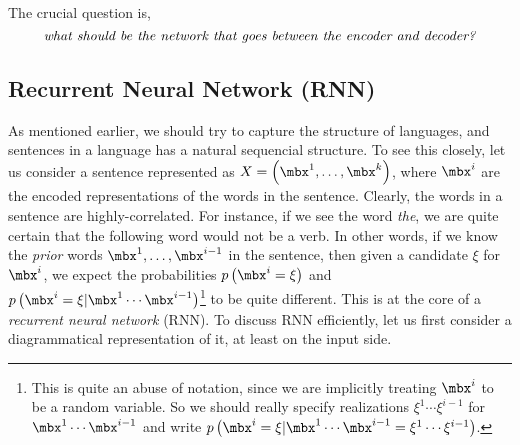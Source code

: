 \documentclass[11pt]{article}
\begin{document}
    \np The crucial question is,
    \begin{equation}
        \text{\textit{what should be the network that goes between the encoder and decoder?}}
    \end{equation}
    
    \subsection{Recurrent Neural Network (RNN)}
    
    As mentioned earlier, we should try to capture the structure of languages, and sentences in a language has a natural sequencial structure. To see this closely, let us consider a sentence represented as $X = \left( \mbx^1,\ldots,\mbx^k \right)$, where $\mbx^i$ are the encoded representations of the words in the sentence. Clearly, the words in a sentence are highly-correlated. For instance, if we see the word \textit{the}, we are quite certain that the following word would not be a verb. In other words, if we know the \textit{prior} words $\mbx^1,\ldots,\mbx^{i-1}$ in the sentence, then given a candidate $\xi$ for $\mbx^i$, we expect the probabilities $p\left( \mbx^i=\xi \right)$ and $p\left( \mbx^i=\xi | \mbx^1\cdots\mbx^{i-1} \right)$\footnote{This is quite an abuse of notation, since we are implicitly treating $\mbx^i$ to be a random variable. So we should really specify realizations $\xi^1\cdots \xi^{i-1}$ for $\mbx^1\cdots\mbx^{i-1}$ and write $p\left( \mbx^i=\xi | \mbx^1\cdots\mbx^{i-1} = \xi^1\cdots\xi^{i-1} \right)$.} to be quite different. This is at the core of a \textit{recurrent neural network} (RNN). To discuss RNN efficiently, let us first consider a diagrammatical representation of it, at least on the input side.
\end{document}

